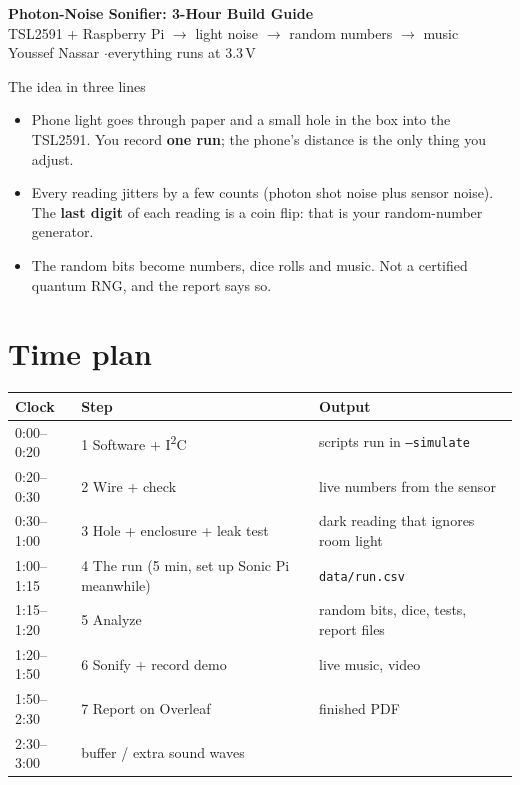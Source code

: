 \documentclass[11pt]{article}
\begin{document}
{\LARGE\bfseries Photon-Noise Sonifier: 3-Hour Build Guide}\\[3pt]
{\large TSL2591 + Raspberry Pi $\rightarrow$ light noise $\rightarrow$ random numbers $\rightarrow$ music}\\[2pt]
{\small Youssef Nassar \quad$\cdot$\quad everything runs at 3.3\,V}

\begin{note}[warn]{The idea in three lines}
\begin{itemize}
\item Phone light goes through paper and a small hole in the box into the TSL2591. You record \textbf{one run}; the
  phone's distance is the only thing you adjust.
\item Every reading jitters by a few counts (photon shot noise plus sensor noise). The \textbf{last digit} of
  each reading is a coin flip: that is your random-number generator.
\item The random bits become numbers, dice rolls and music. Not a certified quantum RNG, and the report says so.
\end{itemize}
\end{note}

\section*{Time plan}
\begin{tabularx}{\linewidth}{@{}l l X@{}}
\toprule
Clock & Step & Output \\
\midrule
0:00--0:20 & 1 Software + I\textsuperscript{2}C & scripts run in \texttt{--simulate} \\
0:20--0:30 & 2 Wire + check & live numbers from the sensor \\
0:30--1:00 & 3 Hole + enclosure + leak test & dark reading that ignores room light \\
1:00--1:15 & 4 The run (5 min, set up Sonic Pi meanwhile) & \texttt{data/run.csv} \\
1:15--1:20 & 5 Analyze & random bits, dice, tests, report files \\
1:20--1:50 & 6 Sonify + record demo & live music, video \\
1:50--2:30 & 7 Report on Overleaf & finished PDF \\
2:30--3:00 & buffer / extra sound waves & \\
\bottomrule
\end{tabularx}
\end{document}
